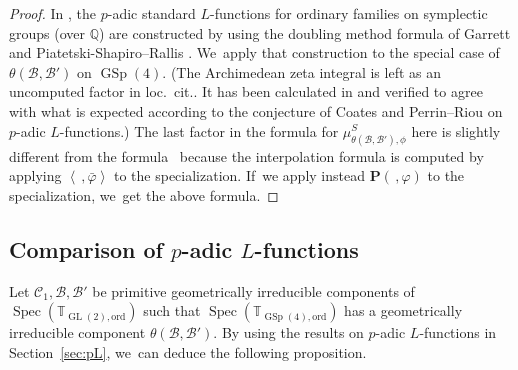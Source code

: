 \documentclass[10pt]{amsart}
\newcommand{\loccit}{loc.\ cit.}
\newcommand{\Lfunctions}{$L$\nobreakdash-func\-tions\xspace}
\theoremstyle{plain}
\theoremstyle{remark}
\newcommand{\bQ}{\mathbb{Q}}
\newcommand{\bT}{\mathbb{T}}
\newcommand{\sB}{\mathscr{B}}
\newcommand{\sC}{\mathscr{C}}
\newcommand{\bfP}{\mathbf{P}}
\DeclareMathOperator{\GL}{GL}
\DeclareMathOperator{\GSp}{GSp}
\newcommand{\ord}{\mathrm{ord}}
\DeclareMathOperator{\Spec}{Spec}
\begin{document}
\begin{proof}
In \cite{SLF}, the $p$-adic standard \Lfunctions for ordinary families on symplectic groups (over $\bQ$) are constructed by using the doubling method formula of Garrett \cite{GaPull} and Piatetski-Shapiro--Rallis \cite{PSR}. We~apply that construction to the special case of $\theta(\sB,\sB')$ on $\GSp(4)$. (The Archimedean zeta integral is left as an uncomputed factor in \loccit. It has been calculated in \cite{AZI} and verified to agree with what is expected according to the conjecture of Coates and Perrin--Riou on $p$\nobreakdash-adic \Lfunctions.) The last factor in the formula for $\mu^S_{\theta(\sB,\sB'),\phi}$ here is slightly different from the formula~\cite[(7.0.1)]{SLF} because the interpolation formula is computed by applying $\left<\,,\bar{\varphi}\right>$ to the specialization. If~we apply instead $\bfP(\,,\varphi)$ to the specialization, we~get the above formula.
\end{proof}

\subsection{Comparison of \texorpdfstring{$p$-adic \protect\Lfunctions}{pL}}\label{sec:compare}
Let $\sC_1,\sB,\sB'$ be primitive geometrically irreducible components of $\Spec(\bT_{\GL(2),\ord})$ such that $\Spec(\bT_{\GSp(4),\ord})$ has a geometrically irreducible component $\theta(\sB,\sB')$. By using the results on $p$-adic \Lfunctions in Section~\ref{sec:pL}, we~can deduce the following proposition.
\end{document}
